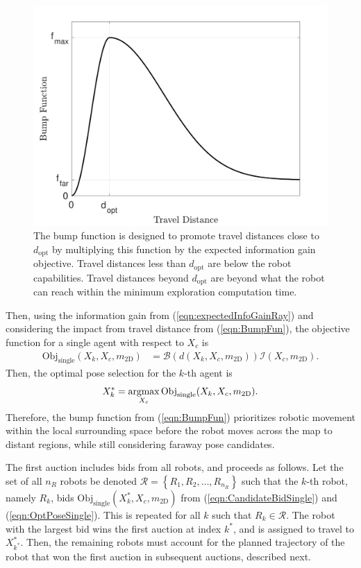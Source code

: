 \documentclass[smallextended]{svjour3}       %
\newcommand{\braces}[1]{\ensuremath{\left\{ #1 \right\}}}
\newcommand{\refeqn}[1]{(\ref{eqn:#1})}
\newcommand{\argmax}{\operatornamewithlimits{argmax}}
\begin{document}
	\begin{figure}
		\centerline{
			\includegraphics[width=0.9\columnwidth]{NonZeroBump.pdf}
		}
		\caption{The bump function is designed to promote travel distances close to $d_\text{opt}$ by multiplying this function by the expected information gain objective. Travel distances less than $d_\text{opt}$ are below the robot capabilities. Travel distances beyond $d_\text{opt}$ are beyond what the robot can reach within the minimum exploration computation time.}
		\label{fig:nonzeroBumpFun}
	\end{figure}
	
Then, using the information gain from \refeqn{expectedInfoGainRay} and considering the impact from travel distance from \refeqn{BumpFun}, the objective function for a single agent with respect to $X_{c}$ is
\begin{align}
\label{eqn:CandidateBidSingle}
\text{Obj}_\text{single}(X_k,X_c,m_\text{2D})&=\mathcal B(d(X_k,X_c,m_\text{2D}))\mathcal I(X_{c},m_\text{2D}).
\end{align}
Then, the optimal pose selection for the $k$-th agent is
\begin{align}
\label{eqn:OptPoseSingle}
X^*_{k}=\argmax_{X_c}\text{Obj}_\text{single}(X_k,X_c,m_\text{2D}).
\end{align}
Therefore, the bump function from \refeqn{BumpFun} prioritizes robotic movement within the local surrounding space before the robot moves across the map to distant regions, while still considering faraway pose candidates.

The first auction includes bids from all robots, and proceeds as follows. Let the set of all $n_R$ robots be denoted $\mathcal R=\braces{R_1,R_2,\dots,R_{n_R}}$ such that the $k$-th robot, namely $R_k$, bids $\text{Obj}_\text{single}(X^*_k,X_c,m_\text{2D})$ from \refeqn{CandidateBidSingle} and \refeqn{OptPoseSingle}. This is repeated for all $k$ such that $R_k\in\mathcal R$. The robot with the largest bid wins the first auction at index $k^*$, and is assigned to travel to $X^*_{k^*}$. Then, the remaining robots must account for the planned trajectory of the robot that won the first auction in subsequent auctions, described next.
\end{document}
